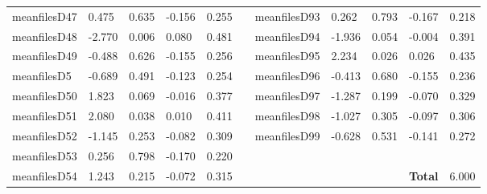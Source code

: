 \begin{table}[h!]
\begin{tabular}{lllllllllll}
meanfilesD47  & 0.475            & 0.635            & -0.156              & 0.255               &           & meanfilesD93  & 0.262            & 0.793            & -0.167              & 0.218               \\
meanfilesD48  & -2.770           & 0.006            & 0.080               & 0.481               &           & meanfilesD94  & -1.936           & 0.054            & -0.004              & 0.391               \\
meanfilesD49  & -0.488           & 0.626            & -0.155              & 0.256               &           & meanfilesD95  & 2.234            & 0.026            & 0.026               & 0.435               \\
meanfilesD5   & -0.689           & 0.491            & -0.123              & 0.254               &           & meanfilesD96  & -0.413           & 0.680            & -0.155              & 0.236               \\
meanfilesD50  & 1.823            & 0.069            & -0.016              & 0.377               &           & meanfilesD97  & -1.287           & 0.199            & -0.070              & 0.329               \\
meanfilesD51  & 2.080            & 0.038            & 0.010               & 0.411               &           & meanfilesD98  & -1.027           & 0.305            & -0.097              & 0.306               \\
meanfilesD52  & -1.145           & 0.253            & -0.082              & 0.309               &           & meanfilesD99  & -0.628           & 0.531            & -0.141              & 0.272               \\ \cline{7-11} 
meanfilesD53  & 0.256            & 0.798            & -0.170              & 0.220               &           &               &                  &                  &                     &                     \\
meanfilesD54  & 1.243            & 0.215            & -0.072              & 0.315               &           &               &                  &                  & \textbf{Total}      & 6.000              
\end{tabular}
\end{table}

